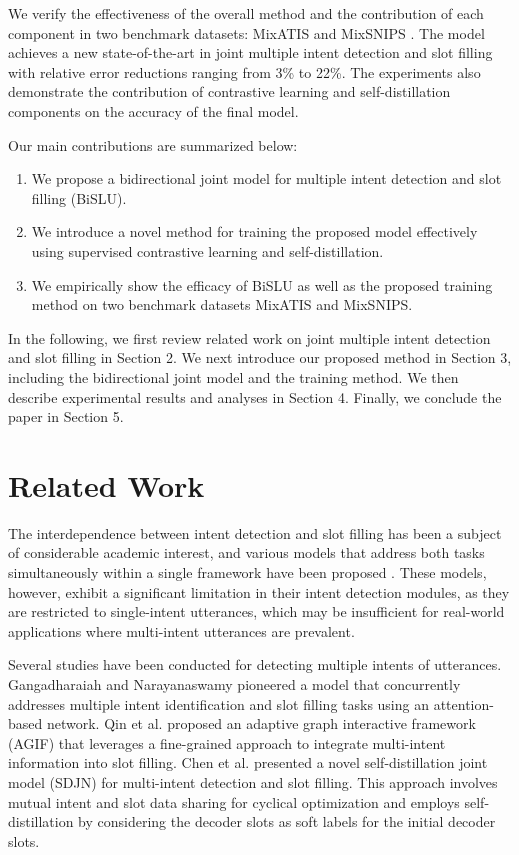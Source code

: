 \documentclass{ecai}
\begin{document}
We verify the effectiveness of the overall method and the contribution of each component in two benchmark datasets: MixATIS and MixSNIPS \cite{qin:2020}. The model achieves a new state-of-the-art in joint multiple intent detection and slot filling with relative error reductions ranging from 3\% to 22\%. The experiments also demonstrate the contribution of contrastive learning and self-distillation components on the accuracy of the final model.

Our main contributions are summarized below:

\begin{enumerate}
    \item We propose a bidirectional joint model for multiple intent detection and slot filling (BiSLU).
    \item We introduce a novel method for training the proposed model effectively using supervised contrastive learning and self-distillation. 
    \item We empirically show the efficacy of BiSLU as well as the proposed training method on two benchmark datasets MixATIS and MixSNIPS. 
\end{enumerate}

In the following, we first review related work on joint multiple intent detection and slot filling in Section 2. We next introduce our proposed method in Section 3, including the bidirectional joint model and the training method. We then describe experimental results and analyses in Section 4. Finally, we conclude the paper in Section 5.  

\section{Related Work}
The interdependence between intent detection and slot filling has been a subject of considerable academic interest, and various models that address both tasks simultaneously within a single framework have been proposed \cite{Haihong:2019,Qin:2019,qin:2021co}. These models, however, exhibit a significant limitation in their intent detection modules, as they are restricted to single-intent utterances, which may be insufficient for real-world applications where multi-intent utterances are prevalent.

Several studies have been conducted for detecting multiple intents of utterances. Gangadharaiah and Narayanaswamy \cite{gangadharaiah-narayanaswamy:2019} pioneered a model that concurrently addresses multiple intent identification and slot filling tasks using an attention-based network. Qin et al. \cite{qin:2020} proposed an adaptive graph interactive framework (AGIF) that leverages a fine-grained approach to integrate multi-intent information into slot filling. Chen et al. \cite{chen:2022} presented a novel self-distillation joint model (SDJN) for multi-intent detection and slot filling. This approach involves mutual intent and slot data sharing for cyclical optimization and employs self-distillation by considering the decoder slots as soft labels for the initial decoder slots.
\end{document}
